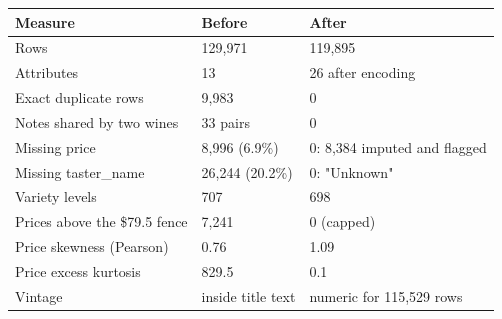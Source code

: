 \begin{tabular}{lll}
\toprule
\textbf{Measure} & \textbf{Before} & \textbf{After} \\
\midrule
Rows & 129,971 & 119,895 \\
Attributes & 13 & 26 after encoding \\
Exact duplicate rows & 9,983 & 0 \\
Notes shared by two wines & 33 pairs & 0 \\
Missing price & 8,996 (6.9\%) & 0: 8,384 imputed and flagged \\
Missing taster\_name & 26,244 (20.2\%) & 0: "Unknown" \\
Variety levels & 707 & 698 \\
Prices above the \$79.5 fence & 7,241 & 0 (capped) \\
Price skewness (Pearson) & 0.76 & 1.09 \\
Price excess kurtosis & 829.5 & 0.1 \\
Vintage & inside title text & numeric for 115,529 rows \\
\bottomrule
\end{tabular}
